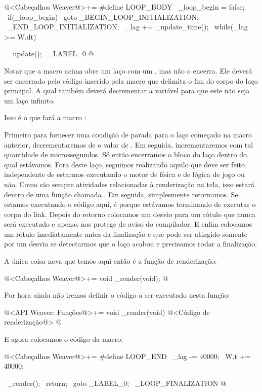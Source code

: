 \iniciocodigo
@<Cabeçalhos Weaver@>+=
#define LOOP_BODY                                            \
  _loop_begin =  false;                                      \
  if(_loop_begin)                                            \
    goto _BEGIN_LOOP_INITIALIZATION;                         \
_END_LOOP_INITIALIZATION:                                    \
  _lag += _update_time();                                    \
  while(_lag >= W.dt){                                       \
    _update();                                               \
_LABEL_0
@
\fimcodigo

Notar que a macro acima abre um laço com um \monoespaco{while}, mas
não o encerra. Ele deverá ser encerrado pelo código inserido pela
macro que delimita o fim do corpo do laço principal. A qual também
deverá decrementar a variável  para que este não
seja um laço infinito.


Isso é o que fará a macro \monoespaco{LOOP\_END}:

Primeiro para fornecer uma condição de parada para o laço começado na
macro anterior, decrementaremos de \monoespaco{\_lag} o valor
de \monoespaco{W.dt}. Em seguida, incrementaremos  com
tal quantidade de microssegundos. Só então encerramos o bloco do laço
dentro do qual estávamos. Fora deste laço, seguimos realizando aquilo
que deve ser feito independente de estarmos executando o motor de
física e de lógica de jogo ou não. Como são sempre atividades
relacionadas à renderização na tela, isso estará dentro de uma função
chamada \monoespaco{\_render}. Em seguida, simplesmente retornamos. Se
estamos executando o código aqui, é porque estávamos terminando de
executar o corpo do link. Depois do retorno colocamos um desvio para
um rótulo que nunca será executado e apenas nos protege de aviso do
compilador. E enfim colocamos um rótulo imediatamente antes da
finalização e que pode ser atingido somente por um desvio se
detectarmos que o laço acabou e precisamos rodar a finalização.

A única coisa nova que temos aqui então é a função de renderização:

\iniciocodigo
@<Cabeçalhos Weaver@>+=
void _render(void);
@
\fimcodigo

Por hora ainda não iremos definir o código a ser executado nesta
função:

\iniciocodigo
@<API Weaver: Funções@>+=
void _render(void){
  @<Código de renderização@>
}
@
\fimcodigo

E agora colocamos o código da macro:

\iniciocodigo
@<Cabeçalhos Weaver@>+=
#define LOOP_END                                           \
    _lag -=  40000;                                        \
    W.t +=  40000;                                         \
  }                                                        \
  _render();                                               \
  return;                                                  \
  goto _LABEL_0;                                           \
_LOOP_FINALIZATION
@
\fimcodigo

